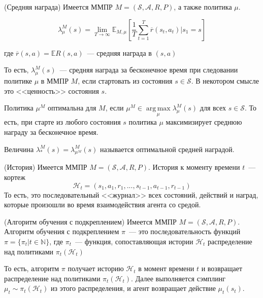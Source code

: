 \documentclass[a4paper]{article}
\DeclareMathOperator*{\argmax}{arg\,max}
\newcommand{\Hh}{\mathcal{H}}
\newcommand{\E}{\mathbb{E}}
\newcommand{\N}{\mathbb{N}}
\newcommand{\Ss}{\mathcal{S}}
\newcommand{\A}{\mathcal{A}}
\begin{document}
\begin{definition}{(Средняя награда)}
Имеется ММПР $M=(\Ss, \A,R,P)$, а также политика $\mu$.

$$\lambda_{\mu}^M(s)=\lim\limits_{T\to\infty}\E_{M,\mu}\left[\frac{1}{T}\sum\limits_{t=1}^T\overline{r}(s_t,a_t)\big|s_1=s\right]$$

где $\overline{r}(s,a)=\E R(s,a)$~--- средняя награда в $(s,a)$

То есть, $\lambda_{\mu}^M(s)$~--- средняя награда за бесконечное время при следовании политике $\mu$ в ММПР $M$, если стартовать из состояния $s\in\Ss$. В некотором смысле это <<ценность>> состояния $s$.

Политика $\mu^M$ оптимальна для $M$, если $\mu^M\in\argmax\limits_{\mu}\lambda^M_{\mu}(s)$ для всех $s\in\Ss$. То есть, при старте из любого состояния $s$ политика $\mu$ максимизирует среднюю награду за бесконечное время.

Величина $\lambda_*^M(s)=\lambda_{\mu^M}^M(s)$ называется оптимальной средней наградой.
\end{definition}

\begin{definition}{(История)}
Имеется ММПР $M=(\Ss,\A,R,P)$. История к моменту времени $t$~--- кортеж $$\Hh_t=(s_1,a_1,r_1,...,s_{t-1},a_{t-1},r_{t-1})$$
То есть, это последовательный <<журнал>> всех состояний, действий и наград, которые произошли во время взаимодействия агента со средой.
\end{definition}

\begin{definition}{(Алгоритм обучения с подкреплением)}
Имеется ММПР $M=(\Ss, \A,R,P)$. Алгоритм обучения с подкреплением $\pi$~--- это последовательность функций $\pi=\{\pi_t\big|t\in\N\}$, где $\pi_t$~--- функция, сопоставляющая истории $\Hh_t$ распределение над политиками $\pi_t(\Hh_t)$
	
То есть, алгоритм $\pi$ получает историю $\Hh_t$ в момент времени $t$ и возвращает распределение над политиками $\pi_t(\Hh_t)$. Далее выполняется сэмплинг $\mu_t\sim\pi_t(\Hh_t)$ из этого распределения, и агент возвращает действие $\mu_t(s_t)$.
\end{definition}
\end{document}
